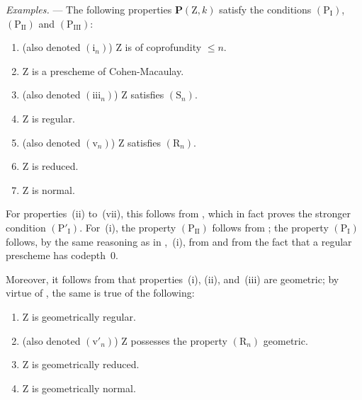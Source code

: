 \begin{env}[7.3.8]
\label{IV.7.3.8}
\emph{Examples.} ---
The following properties $\boldsymbol{P}(\mathrm{Z},k)$ satisfy the conditions $(\mathrm{P_I})$, $(\mathrm{P_{II}})$ and $(\mathrm{P_{III}})$:
\begin{enumerate}[label=(\roman*)]
  \item (also denoted $(\mathrm{i}_n)$) $\mathrm{Z}$ is of coprofundity $\leqslant n$.
  \item $\mathrm{Z}$ is a prescheme of Cohen-Macaulay.
  \item (also denoted $(\mathrm{iii}_n)$) $\mathrm{Z}$ satisfies $(\mathrm{S}_n)$.
  \item $\mathrm{Z}$ is regular.
  \item (also denoted $(\mathrm{v}_n)$) $\mathrm{Z}$ satisfies $(\mathrm{R}_n)$.
  \item $\mathrm{Z}$ is reduced.
  \item $\mathrm{Z}$ is normal.
\end{enumerate}
For properties~(ii) to~(vii), this follows from , which in fact proves the stronger condition $(\mathrm{P}'_\mathrm{I})$.
For~(i), the property $(\mathrm{P_{II}})$ follows from ; the property $(\mathrm{P_I})$ follows, by the same reasoning as in ,~(i), from  and from the fact that a regular prescheme has codepth~$0$.

Moreover, it follows from  that properties~(i), (ii), and~(iii) are geometric; by virtue of , the same is true of the following:
\begin{enumerate}[label=(\roman*')]
  \item[(iv')] $\mathrm{Z}$ is geometrically regular.
  \item[(v')] (also denoted $(\mathrm{v}'_n)$) $\mathrm{Z}$ possesses the property $(\mathrm{R}_n)$ geometric.
  \item[(vi')] $\mathrm{Z}$ is geometrically reduced.
  \item[(vii')] $\mathrm{Z}$ is geometrically normal.
\end{enumerate}
\end{env}

